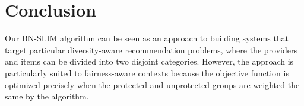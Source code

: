 


\section{Conclusion}

Our BN-SLIM algorithm can be seen as an approach to building systems that target particular diversity-aware recommendation problems, where the providers and items can be divided into two disjoint categories. However, the approach is particularly suited to fairness-aware contexts because the objective function is optimized precisely when the protected and unprotected groups are weighted the same by the algorithm. 

